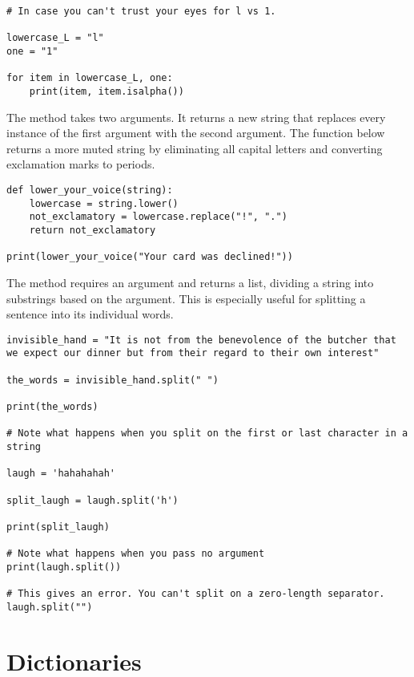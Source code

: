 \begin{lstlisting}
# In case you can't trust your eyes for l vs 1. 

lowercase_L = "l"
one = "1"

for item in lowercase_L, one:
    print(item, item.isalpha())
\end{lstlisting}

The  method takes two arguments. It returns a new string that replaces every instance of the first argument with the second argument. The function below returns a more muted string by eliminating all capital letters and converting exclamation marks to periods. 

\begin{lstlisting}
def lower_your_voice(string):
    lowercase = string.lower()
    not_exclamatory = lowercase.replace("!", ".")
    return not_exclamatory
    
print(lower_your_voice("Your card was declined!"))
\end{lstlisting}

\smallskip
The  method requires an argument and returns a list, dividing a string into substrings based on the argument. This is especially useful for splitting a sentence into its individual words.

\begin{lstlisting}
invisible_hand = "It is not from the benevolence of the butcher that we expect our dinner but from their regard to their own interest"

the_words = invisible_hand.split(" ")

print(the_words)

# Note what happens when you split on the first or last character in a string

laugh = 'hahahahah'

split_laugh = laugh.split('h')

print(split_laugh)

# Note what happens when you pass no argument
print(laugh.split())

# This gives an error. You can't split on a zero-length separator.
laugh.split("")
\end{lstlisting}



\section{Dictionaries}
\smallskip

